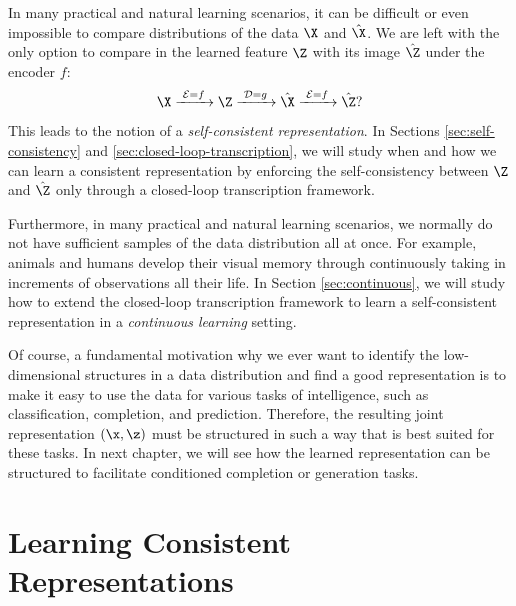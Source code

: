 \documentclass[../../book-main.tex]{subfiles}
\begin{document}
In many practical and natural learning scenarios, it can be difficult or even impossible to compare distributions of the data $\X$ and $\hat \X$. We are left with the only option to compare in the learned feature $\Z$ with its image $\hat \Z$ under the encoder $f$: 
\begin{equation}
 \X
\xrightarrow{\hspace{1mm} \mathcal{E} = f \hspace{1mm}} \Z  \xrightarrow{\hspace{1mm} \mathcal{D} = g \hspace{1mm}} \hat{\X} \xrightarrow{\hspace{1mm} \mathcal{E} = f \hspace{1mm}} \hat \Z?
\end{equation}
This leads to the notion of a {\em self-consistent representation}. In Sections \ref{sec:self-consistency} and \ref{sec:closed-loop-transcription}, we will study when and how we can learn a consistent representation by enforcing the self-consistency between $\Z$ and $\hat \Z$ only through a closed-loop transcription framework. 

Furthermore, in many practical and natural learning scenarios, we normally do not have sufficient samples of the data distribution all at once. For example, animals and humans develop their visual memory through continuously taking in increments of observations all their life. In Section \ref{sec:continuous}, we will study how to extend the closed-loop transcription framework to learn a self-consistent representation in a  {\em continuous learning} setting.

Of course, a fundamental motivation why we ever want to identify the
low-dimensional structures in a data distribution and find a good
representation is to make it easy to use the data for various tasks
of intelligence, such as classification, completion, and prediction.
Therefore, the resulting joint representation $(\x, \z)$ must be
structured in such a way that is best suited for these tasks. In
next chapter, we will
see how the learned representation can be structured to facilitate
conditioned completion or generation tasks.

\section{Learning Consistent Representations}\label{sec:consistent-representation}
\end{document}
